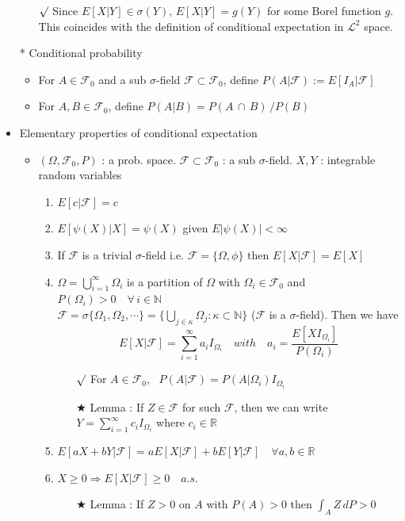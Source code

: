 \documentclass[12pt, A4]{article}
\newcommand{\rmk}{$\surd$}
\newcommand{\trick}{$\bigstar$}
\newcommand{\N}{\mathbb{N}}
\newcommand{\R}{\mathbb{R}}
\newcommand{\F}{\mathcal{F}}
\newcommand{\LL}{\mathcal{L}}
\newcommand{\intersect}{\,\cap\,}
\begin{document}
\begin{itemize}
\begin{itemize}
		\item[\rmk] Since $E[X|Y]\in \sigma(Y)$, $E[X|Y]=g(Y)$ for some Borel function $g$. This coincides with the definition of conditional expectation in $\LL^2$ space.
	\end{itemize}
	\item[*] Conditional probability 
	\begin{itemize}
		\item For $A\in \F_0$ and a sub $\sigma$-field $\F\subset \F_0$, define $P(A|\F):=E[I_A|\F]$
		\item For $A,B\in \F_0$, define $P(A|B)=P(A\intersect B)\,/ P(B)$
	\end{itemize}
	\item Elementary properties of conditional expectation
	\begin{itemize}
		\item $(\Omega, \F_0, P)$ : a prob. space. \; $\F\subset \F_0$ : a sub $\sigma$-field. \; $X, Y$ : integrable random variables 
		\begin{enumerate}
			\item $E[c|\F]=c$
			\item $E[\psi(X)|X]=\psi(X)$\; given $E|\psi(X)|<\infty$
			\item If $\F$ is a trivial $\sigma$-field i.e. $\F=\{\Omega, \phi\}$ then $E[X|\F]=E[X]$
			\item $\Omega=\bigcup_{i=1}^\infty \Omega_i$ is a partition of $\Omega$ with $\Omega_i\in \F_0$ and $P(\Omega_i)>0\quad \forall \, i\in \N$ \\ $\F=\sigma\{\Omega_1, \Omega_2,\cdots\}=\{\bigcup_{j\in \kappa} \Omega_j : \kappa\subset \N\}$ \quad ($\F$ is a $\sigma$-field). \quad Then we have 
			$$ E[X|\F]=\sum_{i=1}^\infty a_i I_{\Omega_i} \quad with \quad a_i=\frac{E[XI_{\Omega_i}]}{P(\Omega_i)}$$
			\begin{itemize}
				\item[\rmk] For $A\in \F_0$, \, $P(A|\F)=P(A|\Omega_i)I_{\Omega_i}$
				\item[\trick] Lemma : If $Z\in \F$ for such $\F$, then we can write $Y=\sum_{i=1}^\infty c_i I_{\Omega_i}$ where $c_i\in \R$
			\end{itemize}
			\item $E[aX+bY|\F]=aE[X|\F]+bE[Y|\F]\quad \forall a,b\in \R$
			\item $X\geq 0 \Rightarrow E[X|\F]\geq 0\quad a.s$.
			\begin{itemize}
				\item[\trick] Lemma : If $Z>0$ on $A$ with $P(A)>0$ then $\int _A Z\, dP>0$

\end{itemize}
\end{enumerate}
\end{itemize}
\end{itemize}
\end{document}
